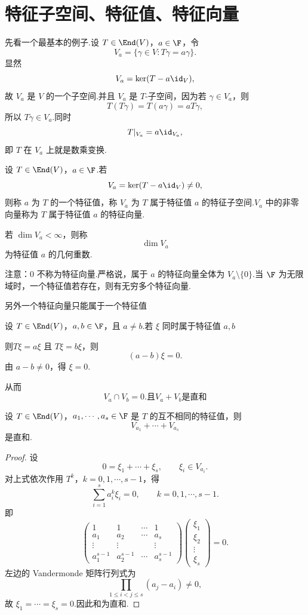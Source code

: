 \section{特征子空间、特征值、特征向量}

先看一个最基本的例子.设 $T\in\End(V)$，$a\in\F$，令
\[
V_a=\{\gamma\in V:T\gamma=a\gamma\}.
\]
显然
\[
V_a=\ker(T-a\id_V),
\]
故 $V_a$ 是 $V$ 的一个子空间.并且 $V_a$ 是 $T$-子空间，因为若 $\gamma\in V_a$，则
\[
T(T\gamma)=T(a\gamma)=aT\gamma,
\]
所以 $T\gamma\in V_a$.同时
\[
T|_{V_a}=a\id_{V_a},
\]
即 $T$ 在 $V_a$ 上就是数乘变换.

\begin{definition}\label{p1:concept:c5-l171}
	设 $T\in\End(V)$，$a\in\F$.若
	\[
	V_a=\ker(T-a\id_V)\neq0,
	\]
	则称 $a$ 为 $T$ 的一个特征值，称 $V_a$ 为 $T$ 属于特征值 $a$ 的特征子空间.$V_a$ 中的非零向量称为 $T$ 属于特征值 $a$ 的特征向量.
	
	若 $\dim V_a<\infty$，则称
	\[
	\dim V_a
	\]
	为特征值 $a$ 的几何重数.
\end{definition}

注意：$0$ 不称为特征向量.严格说，属于 $a$ 的特征向量全体为 $V_a\setminus\{0\}$.当 $\F$ 为无限域时，一个特征值若存在，则有无穷多个特征向量.

另外一个特征向量只能属于一个特征值

	设 $T\in\End(V)$，$a,b\in\F$，且 $a\neq b$.若 $\xi$ 同时属于特征值 $a,b$

则$T\xi=a\xi$ 且 $T\xi=b\xi$，则
	\[
	(a-b)\xi=0.
	\]
	由 $a-b\neq0$，得 $\xi=0$.

从而
\[
V_a\cap V_b=0.\text{且}V_a + V_b \text{是直和}
\]

\begin{proposition}
	设 $T\in\End(V)$，$a_1,\cdots,a_s\in\F$ 是 $T$ 的互不相同的特征值，则
	\[
	V_{a_1}+\cdots+V_{a_s}
	\]
	是直和.
\end{proposition}

\begin{proof}
	设
	\[
	0=\xi_1+\cdots+\xi_s,\qquad \xi_i\in V_{a_i}.
	\]
	对上式依次作用 $T^k$，$k=0,1,\cdots,s-1$，得
	\[
	\sum_{i=1}^s a_i^k\xi_i=0,
	\qquad k=0,1,\cdots,s-1.
	\]
	即
	\[
	\begin{pmatrix}
		1&1&\cdots&1\\
		a_1&a_2&\cdots&a_s\\
		\vdots&\vdots&&\vdots\\
		a_1^{s-1}&a_2^{s-1}&\cdots&a_s^{s-1}
	\end{pmatrix}
	\begin{pmatrix}
		\xi_1\\ \xi_2\\ \vdots\\ \xi_s
	\end{pmatrix}
	=0.
	\]
	左边的 Vandermonde 矩阵行列式为
	\[
	\prod_{1\leq i<j\leq s}(a_j-a_i)\neq0,
	\]
	故 $\xi_1=\cdots=\xi_s=0$.因此和为直和.
\end{proof}


